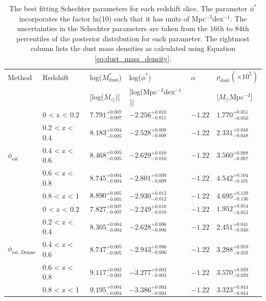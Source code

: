 \begin{table}
    \centering
    \begin{tabular}{p{1.75cm}|p{2.5cm}|p{2cm}|p{3.25cm}|p{1.25cm}|p{2cm}}
        \hline
        \hline
        Method & Redshift & log($M_{\textrm{dust}}^*$) & log($\phi^*$) & $\alpha$ & $\rho_{\textrm{dust}} (\times10^5)$ \\
        & & [log($M_{\odot}$)] & [log(Mpc$^{-3}$dex$^{-1}$)] & & [$M_{\odot}$Mpc$^{-3}$] \\
        \hline
        \hline
        \multirow{5}{*}{$\phi_{\textrm{est}}$} & 0 < z < 0.2 & $7.791^{+0.007}_{-0.007}$ & $-2.256^{+0.010}_{-0.011}$ & $-1.22$ & $1.770^{+0.051}_{-0.050}$ \\
        & 0.2 < z < 0.4 & $8.183^{+0.004}_{-0.005}$ & $-2.528^{+0.008}_{-0.008}$ & $-1.22$ & $2.331^{+0.048}_{-0.048}$ \\
        & 0.4 < z < 0.6 & $8.468^{+0.005}_{-0.005}$ & $-2.629^{+0.010}_{-0.010}$ & $-1.22$ & $3.560^{+0.088}_{-0.087}$ \\
        & 0.6 < z < 0.8 & $8.745^{+0.004}_{-0.004}$ & $-2.801^{+0.009}_{-0.009}$ & $-1.22$ & $4.542^{+0.104}_{-0.101}$ \\
        & 0.8 < z < 1 & $8.890^{+0.005}_{-0.005}$ & $-2.930^{+0.012}_{-0.012}$ & $-1.22$ & $4.695^{+0.139}_{-0.136}$ \\
        \hline
        \multirow{5}{*}{$\phi_{\textrm{est, Dunne}}$} & 0 < z < 0.2 & $7.827^{+0.007}_{-0.007}$ & $-2.249^{+0.010}_{-0.010}$ & $-1.22$ & $1.952^{+0.054}_{-0.053}$ \\
        & 0.2 < z < 0.4 & $8.305^{+0.004}_{-0.004}$ & $-2.628^{+0.006}_{-0.006}$ & $-1.22$ & $2.451^{+0.041}_{-0.040}$ \\
        & 0.4 < z < 0.6 & $8.747^{+0.005}_{-0.005}$ & $-2.943^{+0.006}_{-0.006}$ & $-1.22$ & $3.288^{+0.059}_{-0.059}$ \\
        & 0.6 < z < 0.8 & $9.117^{+0.003}_{-0.003}$ & $-3.277^{+0.003}_{-0.003}$ & $-1.22$ & $3.570^{+0.039}_{-0.039}$ \\
        & 0.8 < z < 1 & $9.195^{+0.004}_{-0.004}$ & $-3.386^{+0.004}_{-0.004}$ & $-1.22$ & $3.323^{+0.044}_{-0.044}$ \\
        \hline
    \end{tabular}
    \caption[Best fitting Schechter parameters of our SGP DMFs in each redshift slice]{The best fitting Schechter parameters for each redshift slice. The parameter $\phi^*$ incorporates the factor \textrm{ln}(10) such that it has units of Mpc$^{-3}$dex$^{-1}$. The uncertainties in the Schechter parameters are taken from the $16$th to $84$th percentiles of the posterior distribution for each parameter. The rightmost column lists the dust mass densities as calculated using Equation \ref{eq:dust_mass_density}.}
    \label{tab:schechter_parameters}
\end{table}

